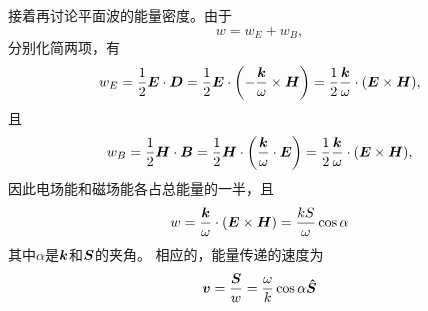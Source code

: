 接着再讨论平面波的能量密度。由于
\[
    w = w_E + w_B,
\]
分别化简两项，有
\[
    w_E = \frac{1}{2} \vb*{E} \cdot \vb*{D} 
        = \frac{1}{2} \vb*{E} \cdot \left( - \frac{\vb*{k}}{\omega} \times \vb*{H} \right) 
        = \frac{1}{2} \frac{\vb*{k}}{\omega} \cdot (\vb*{E} \times \vb*{H}),
\]
且
\[
    w_B = \frac{1}{2} \vb*{H} \cdot \vb*{B} 
        = \frac{1}{2} \vb*{H} \cdot \left( \frac{\vb*{k}}{\omega} \cdot \vb*{E} \right) 
        = \frac{1}{2} \frac{\vb*{k}}{\omega} \cdot (\vb*{E} \times \vb*{H}),
\]
因此电场能和磁场能各占总能量的一半，且
\begin{equation}
    w = \frac{\vb*{k}}{\omega} \cdot (\vb*{E} \times \vb*{H}) = \frac{k S}{\omega} \cos \alpha
    \label{eq:energy-density-and-s}
\end{equation}
其中$\alpha$是$\vb*{k}$和$\vb*{S}$的夹角。
相应的，能量传递的速度为
\begin{equation}
    \vb*{v} = \frac{\vb*{S}}{w} = \frac{\omega}{k}  \cos \alpha \vu*{S}
\end{equation}
